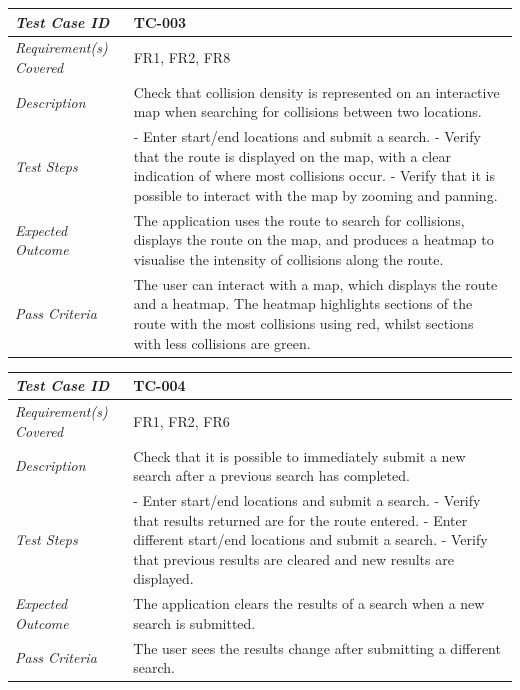 \documentclass[authoryearcitations]{UoYCSproject}
\begin{document}
\begin{tabular}{| p{2.5cm} | p{11cm} |}
	\hline
	\textit{Test Case ID} & TC-003 \\ \hline
	\textit{Requirement(s) Covered} & FR1, FR2, FR8 \\ \hline
	\textit{Description} & Check that collision density is represented on an interactive map when searching for collisions between two locations.  \\ \hline
	\textit{Test Steps}& - Enter start/end locations and submit a search.
	\newline - Verify that the route is displayed on the map, with a clear indication of where most collisions occur.
	\newline - Verify that it is possible to interact with the map by zooming and panning. 
 \\ \hline
	\textit{Expected Outcome} & The application uses the route to search for collisions, displays the route on the map, and produces a heatmap to visualise the intensity of collisions along the route.  \\ \hline
	\textit{Pass Criteria} & The user can interact with a map, which displays the route and a heatmap. The heatmap highlights sections of the route with the most collisions using red, whilst sections with less collisions are green.  \\ \hline
\end{tabular}

\begin{tabular}{| p{2.5cm} | p{11cm} |}
	\hline
	\textit{Test Case ID} & TC-004 \\ \hline
	\textit{Requirement(s) Covered} & FR1, FR2, FR6 \\ \hline
	\textit{Description} & Check that it is possible to immediately submit a new search after a previous search has completed. \\ \hline
	\textit{Test Steps}& - Enter start/end locations and submit a search.
	\newline - Verify that results returned are for the route entered.
	\newline - Enter different start/end locations and submit a search.
	\newline - Verify that previous results are cleared and new results are displayed.
 \\ \hline
	\textit{Expected Outcome} & The application clears the results of a search when a new search is submitted.  \\ \hline
	\textit{Pass Criteria} & The user sees the results change after submitting a different search.  \\ \hline
\end{tabular}
\end{document}
